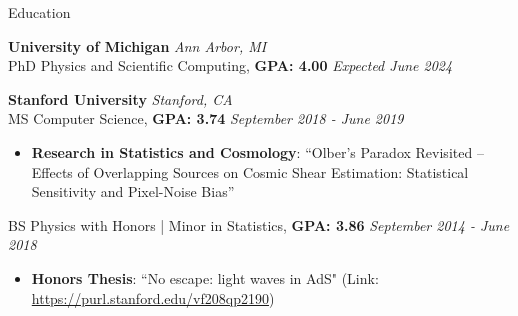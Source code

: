 \documentclass{resume} %
\begin{document}
\begin{rSection}{Education}

{\bf University of Michigan} \hfill {\em Ann Arbor, MI} 
\\ PhD Physics and Scientific Computing, \textbf{GPA: 4.00} \hfill {\em Expected June 2024}
\vspace*{-0.1cm}
%

{\bf Stanford University} \hfill {\em Stanford, CA} 
\\ MS Computer Science, \textbf{GPA: 3.74} \hfill {\em September 2018 - June 2019}

\vspace*{-0.1cm}
%
\begin{itemize}[itemsep=-0.3em] %

    \item 
    \textbf{Research in Statistics and Cosmology}: ``Olber’s Paradox Revisited – Effects of Overlapping Sources on Cosmic Shear Estimation:  Statistical Sensitivity and Pixel-Noise Bias''
\end{itemize}

%
BS Physics with Honors | Minor in Statistics, \textbf{GPA: 3.86} \hfill {\em September 2014 - June 2018}
%
\vspace*{-0.1cm}
\begin{itemize}[itemsep=-0.25em] 

    \item 
    \textbf{Honors Thesis}: ``No escape: light waves in AdS" (Link: \url{https://purl.stanford.edu/vf208qp2190})  

\end{itemize}
%
\vspace*{-0.1cm}
\end{rSection}

\end{document}
